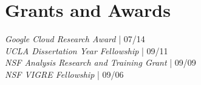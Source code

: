
\section{\sc Grants and Awards}
{\emph{Google Cloud Research Award} |} 07/14\\
{\emph{UCLA Dissertation Year Fellowship} |} 09/11\\ 
{\emph{NSF Analysis Research and Training Grant} |} 09/09\\
{\emph{NSF VIGRE Fellowship} |} 09/06





